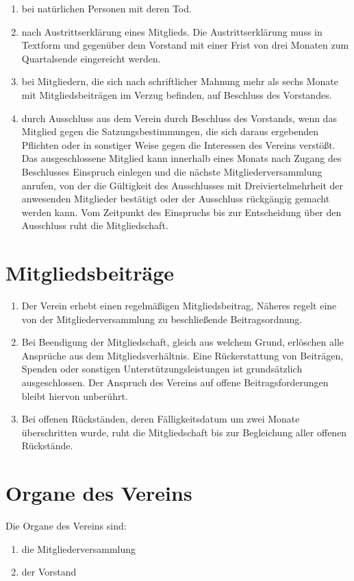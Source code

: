 \documentclass[12pt,a4paper,titlepage]{scrartcl}
\begin{document}
\begin{enumerate}
\item bei natürlichen Personen mit deren Tod.
\item nach Austrittserklärung eines Mitglieds. Die Austrittserklärung muss in Textform und gegenüber dem Vorstand mit einer Frist von drei Monaten zum Quartalsende eingereicht werden.
\item  bei Mitgliedern, die sich nach schriftlicher Mahnung mehr als sechs Monate mit Mitgliedsbeiträgen im Verzug befinden, auf Beschluss des Vorstandes.
\item durch Ausschluss aus dem Verein durch Beschluss des Vorstands, wenn das Mitglied gegen die Satzungsbestimmungen, die sich daraus ergebenden Pflichten oder in sonstiger Weise gegen die Interessen des Vereins verstößt. Das ausgeschlossene Mitglied kann innerhalb eines Monats nach Zugang des Beschlusses Einspruch einlegen und die nächste Mitgliederversammlung anrufen, von der die Gültigkeit des Ausschlusses mit Dreiviertelmehrheit der anwesenden Mitglieder bestätigt oder der Ausschluss rückgängig gemacht werden kann. Vom Zeitpunkt des Einspruchs bis zur Entscheidung über den Ausschluss ruht die Mitgliedschaft.

\end{enumerate}

\section{Mitgliedsbeiträge}
\begin{enumerate}
\item Der Verein erhebt einen regelmäßigen Mitgliedsbeitrag, Näheres regelt eine von der
Mitgliederversammlung zu beschließende Beitragsordnung.
\item Bei Beendigung der Mitgliedschaft, gleich aus welchem Grund, erlöschen alle Ansprüche
aus dem Mitgliedsverhältnis. Eine Rückerstattung von Beiträgen, Spenden oder sonstigen Unterstützungsleistungen ist grundsätzlich ausgeschlossen. Der Anspruch des Vereins auf offene Beitragsforderungen bleibt hiervon unberührt.
\item  Bei offenen Rückständen, deren Fälligkeitsdatum um zwei Monate überschritten wurde, ruht die Mitgliedschaft bis zur Begleichung aller offenen Rückstände.

\end{enumerate}

\section{Organe des Vereins}
Die Organe des Vereins sind:
\begin{enumerate}
\item die Mitgliederversammlung 
\item der Vorstand
\end{enumerate}
\end{document}
